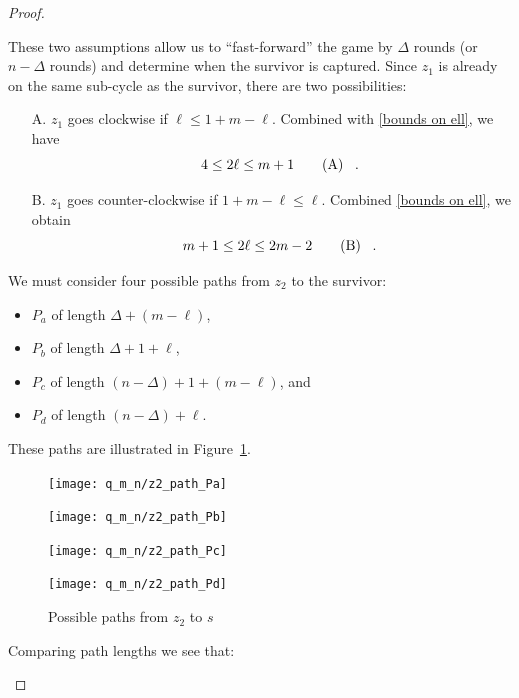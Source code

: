 \begin{proof}
\begin{proofpart}
  These two assumptions allow us to ``fast-forward'' the game by $\Delta$ rounds (or $n-\Delta$ rounds) and determine when the survivor is captured. Since $z_1$ is already on the same sub-cycle as the survivor, there are two possibilities:

  \begin{itemize}
   \item[A.] $z_1$ goes clockwise if $\ell \leq 1 + m - \ell$.
         Combined with \ref{bounds on ell}, we have
         \begin{equation}
           4 \leq 2 \ell \leq m + 1 \tag{A} \label{assumption a} \mperiod
         \end{equation}

   \item[B.] $z_1$ goes counter-clockwise if $1 + m - \ell \leq \ell$.
         Combined \ref{bounds on ell}, we obtain
         \begin{equation}
           m + 1 \leq 2 \ell \leq 2m - 2 \tag{B} \label{assumption b} \mperiod
         \end{equation}

  \end{itemize}

  We must consider four possible paths from $z_2$ to the survivor:

  \begin{itemize}
   \item $P_a$ of length $\Delta + (m - \ell)$,
   \item $P_b$ of length $\Delta + 1 + \ell$,
   \item $P_c$ of length $(n-\Delta) + 1 + (m-\ell)$, and
   \item $P_d$ of length $(n-\Delta) + \ell$.
  \end{itemize}

  These paths are illustrated in Figure~\ref{fig:different_paths}.

  \begin{figure}
    \centering
    \texttt{[image: q\_m\_n/z2\_path\_Pa]}

    \texttt{[image: q\_m\_n/z2\_path\_Pb]}

    \texttt{[image: q\_m\_n/z2\_path\_Pc]}

    \texttt{[image: q\_m\_n/z2\_path\_Pd]}

    \caption{Possible paths from $z_2$ to $s$ \label{fig:different_paths}}
  \end{figure}

  Comparing path lengths we see that:


\end{proofpart}
\end{proof}
